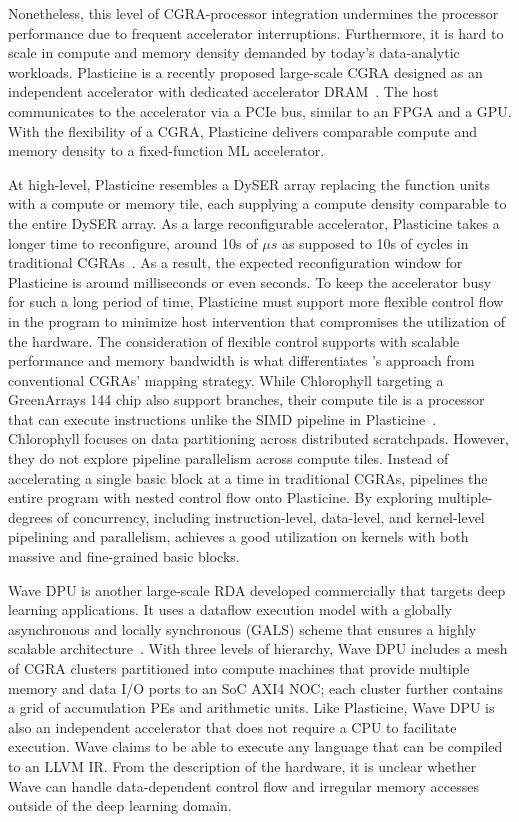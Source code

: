 Nonetheless, this level of CGRA-processor integration undermines the processor performance due to frequent accelerator
interruptions. 
Furthermore, it is hard to scale in compute and memory density demanded by today's data-analytic
workloads.
Plasticine is a recently proposed large-scale CGRA 
designed as an independent accelerator with dedicated accelerator DRAM~\cite{plasticine}.
The host communicates to the accelerator via a PCIe bus, similar to an FPGA and a GPU.
With the flexibility of a CGRA, Plasticine delivers comparable compute and memory density to
a fixed-function ML accelerator.

At high-level, Plasticine resembles a DySER array replacing the function units with a compute or
memory tile, each supplying a compute density comparable to the entire DySER array.
As a large reconfigurable accelerator, Plasticine takes a longer time to reconfigure, around 10s
of $\mu s$ as supposed to 10s of cycles in traditional CGRAs~\cite{dyser}.
As a result, the expected reconfiguration window for Plasticine is around milliseconds or even
seconds.
To keep the accelerator busy for such a long period of time, Plasticine must support more flexible
control flow in the program to minimize host intervention that compromises the utilization of the hardware.
The consideration of flexible control supports with scalable performance and memory
bandwidth is what differentiates \name's approach from conventional CGRAs' mapping strategy.
While Chlorophyll targeting a GreenArrays 144 chip also support branches, their compute tile is a processor that can execute instructions unlike the SIMD pipeline in Plasticine~\cite{synaid}. 
Chlorophyll focuses on data partitioning across distributed scratchpads. However,
they do not explore pipeline parallelism across compute tiles.
Instead of accelerating a single basic block at a time in traditional CGRAs, 
\name pipelines the entire program with nested control flow onto Plasticine.
By exploring multiple-degrees of concurrency, including instruction-level, data-level, and kernel-level
pipelining and parallelism, \name achieves a good utilization on kernels with both massive and fine-grained
basic blocks.

Wave DPU is another large-scale RDA developed commercially that targets deep learning applications.
It uses a dataflow execution model with a globally asynchronous and locally synchronous (GALS) scheme
that ensures a highly scalable architecture~\cite{wavecomputing}.
With three levels of hierarchy, Wave DPU includes a mesh of CGRA clusters partitioned into compute
machines that provide multiple memory and data I/O ports to an SoC AXI4 NOC; each cluster
further contains a grid of accumulation PEs and arithmetic units.
Like Plasticine, Wave DPU is also an independent accelerator that does not require a CPU to facilitate
execution.
Wave claims to be able to execute any language that can be compiled to an LLVM IR.
From the description of the hardware, it is unclear whether Wave can handle data-dependent control flow and
irregular memory accesses outside of the deep learning domain.

